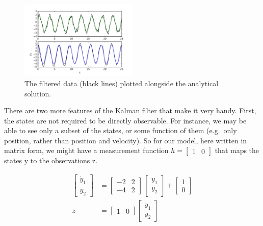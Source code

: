 \documentclass[12pt,oneside]{amsart}
\begin{document}
\begin{figure}[htbp]
\begin{center}
\includegraphics[width = 0.5\textwidth]{Figures/RTS_analytical}
\caption{The filtered data (black lines) plotted alongside the analytical solution.}
\label{fig:RTS_analytical}
\end{center}
\end{figure}


There are two more features of the Kalman filter that make it very handy. First, the states are not required to be directly observable. For instance, we may be able to see only a subset of the states, or some function of them (e.g.\ only position, rather than position and velocity). So for our model, here written in matrix form, we might have a measurement function $h = \begin{bmatrix}
1 & 0
\end{bmatrix}
$ that maps the states y to the observations z. 

\begin{align}
\begin{bmatrix}
\dot y_1 \\
\dot y_2
\end{bmatrix}
&= 
\begin{bmatrix}
-2 & 2 \\
-4 & 2
\end{bmatrix}
\,
\begin{bmatrix}
y_1 \\
y_2
\end{bmatrix}
+
\begin{bmatrix}
1 \\
0
\end{bmatrix}
\\
z &= 
\begin{bmatrix}
1 & 0
\end{bmatrix}
\begin{bmatrix}
y_1 \\
y_2
\end{bmatrix}
%
\end{align}
\end{document}

